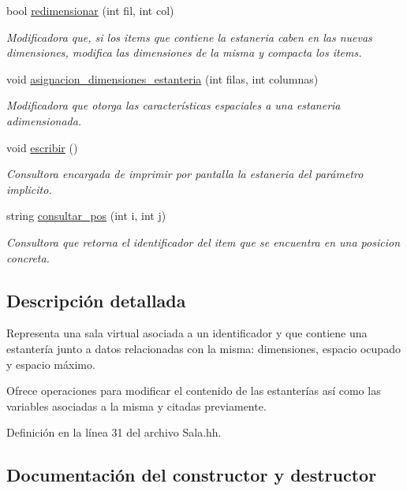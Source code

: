 \begin{DoxyCompactItemize}
bool \hyperlink{class_sala_abed3d192d416f7f14be6e8597f5e6059}{redimensionar} (int fil, int col)
\begin{DoxyCompactList}\small\item\em Modificadora que, si los items que contiene la estaneria caben en las nuevas dimensiones, modifica las dimensiones de la misma y compacta los items. \end{DoxyCompactList}\item 
void \hyperlink{class_sala_a1b8b14baf2acaf5a118fc0e426fc107d}{asignacion\+\_\+dimensiones\+\_\+estanteria} (int filas, int columnas)
\begin{DoxyCompactList}\small\item\em Modificadora que otorga las características espaciales a una estaneria adimensionada. \end{DoxyCompactList}\item 
void \hyperlink{class_sala_afd8421dde833322ed676c232e88cb77c}{escribir} ()
\begin{DoxyCompactList}\small\item\em Consultora encargada de imprimir por pantalla la estaneria del parámetro implicito. \end{DoxyCompactList}\item 
string \hyperlink{class_sala_acb7088c40e1720d1604fc37a4d10443b}{consultar\+\_\+pos} (int i, int j)
\begin{DoxyCompactList}\small\item\em Consultora que retorna el identificador del item que se encuentra en una posicion concreta. \end{DoxyCompactList}\end{DoxyCompactItemize}


\subsection{Descripción detallada}
Representa una sala virtual asociada a un identificador y que contiene una estantería junto a datos relacionadas con la misma\+: dimensiones, espacio ocupado y espacio máximo. 

Ofrece operaciones para modificar el contenido de las estanterías así como las variables asociadas a la misma y citadas previamente. 

Definición en la línea 31 del archivo Sala.\+hh.



\subsection{Documentación del constructor y destructor}

